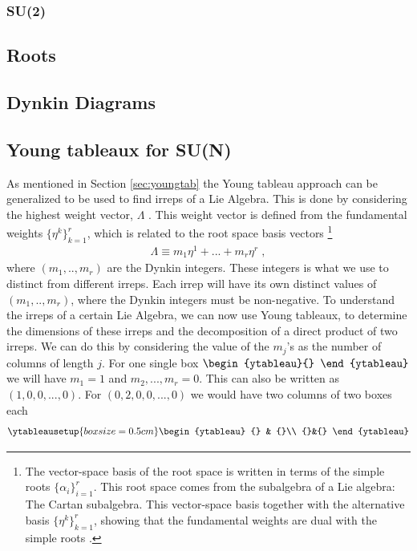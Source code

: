 \subsubsection{SU(2)}

\subsection{Roots}

\subsection{Dynkin Diagrams}

\subsection{Young tableaux for SU(N)}
As mentioned in Section \ref{sec:youngtab} the Young tableau approach can be generalized to be used to find irreps of a Lie Algebra. This is done by considering the highest weight vector, $\Lambda$ \cite{Georgi1999}. This weight vector is defined from the fundamental weights $\{\eta^k\}^r_{k=1}$, which is related to the root space basis vectors \footnote{The vector-space basis of the root space is written in terms of the simple roots $\{\alpha_i\}^r_{i=1}$. This root space comes from the subalgebra of a Lie algebra: The Cartan subalgebra. This vector-space basis together with the alternative basis $\{\eta^k\}^r_{k=1}$, showing that the fundamental weights are dual with the simple roots \cite{YoungTableaux}.}
\begin{align}
    \Lambda\equiv m_1\eta^1 +...+m_r\eta^r\;,
\end{align} 
where $(m_1,..,m_r)$ are the Dynkin integers. These integers is what we use to distinct from different irreps. Each irrep will have its own distinct values of $(m_1,..,m_r)$, where the Dynkin integers must be non-negative. To understand the irreps of a certain Lie Algebra, we can now use Young tableaux, to determine the dimensions of these irreps and the decomposition of a direct product of two irreps. We can do this by considering the value of the $m_j$'s as the number of columns of length $j$. For one single box $\begin{ytableau}{} \end{ytableau}$ we will have $m_1=1$ and $m_2,...,m_r=0$. This can also be written as $(1,0,0,...,0)$. For $(0,2,0,0,...,0)$ we would have two columns of two boxes each
\begin{align}
    \ytableausetup{boxsize=0.5cm}
    \begin{ytableau}
        {} & {}\\ {}&{}
    \end{ytableau}
\end{align}

